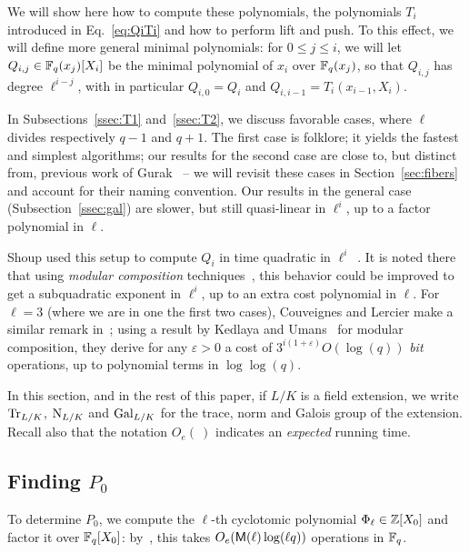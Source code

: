 \documentclass{sig-alternate}
\newcommand{\Cyc}{\Phi}  %
\begin{document}
We will show here how to compute these polynomials, the polynomials
$T_i$ introduced in Eq.~\eqref{eq:QiTi} and how to perform lift and
push.  To this effect, we will define more general minimal
polynomials: for $0 \le j \le i$, we will let $Q_{i,j} \in
\mathbb{F}_q(x_j)[X_i]$ be the minimal polynomial of $x_i$ over $\mathbb{F}_q(x_j)$,
so that $Q_{i,j}$ has degree $\ell^{i-j}$, with in particular
$Q_{i,0}=Q_i$ and $Q_{i,i-1}=T_i(x_{i-1},X_i)$.

In Subsections~\ref{ssec:T1} and~\ref{ssec:T2}, we discuss favorable
cases, where $\ell$ divides respectively $q-1$ and $q+1$. The first
case is folklore; it yields the fastest and simplest algorithms; our
results for the second case are close to, but distinct from, previous
work of Gurak~\cite{gurak06} -- we will revisit these cases in
Section~\ref{sec:fibers} and account for their naming convention. Our
results in the general case (Subsection~\ref{ssec:gal}) are slower,
but still quasi-linear in $\ell^i$, up to a factor polynomial in
$\ell$.

Shoup used this setup to compute $Q_i$ in time quad\-ratic in
$\ell^i$~\cite[Th.~11]{shoup94}. It is noted there that using {\em
  modular composition} techniques~\cite[Ch.~12]{vzGG}, this behavior
could be improved to get a subquadratic exponent in $\ell^i$, up to an
extra cost polynomial in $\ell$.  For $\ell=3$ (where we are in one
the first two cases), Couveignes and Lercier make a similar remark
in~\cite[\S~2.4]{couveignes+lercier11}; using a result by Kedlaya and
Umans~\cite{KeUm11} for modular composition, they derive for any
$\varepsilon > 0$ a cost of $3^{i(1+\varepsilon)}O(\log(q))$ {\em bit}
operations, up to polynomial terms in $\log\log(q)$.

In this section, and in the rest of this paper, if $L/K$ is a field
extension, we write $\operatorname{Tr}_{L/K}$, $\operatorname{N}_{L/K}$ and $\operatorname{Gal}_{L/K}$ for
the trace, norm and Galois group of the extension. Recall also that
the notation $O_e(\ )$ indicates an {\em expected} running time.


\subsection{Finding $P_0$}

To determine $P_0$, we compute the $\ell$-th cyclotomic polynomial
$\Cyc_\ell \in \Z[X_0]$ and factor it over $\mathbb{F}_q[X_0]$:
by~\cite[Th.~9]{shoup94}, this takes $O_e(\mathsf{M}(\ell)\log(\ell q))$
operations in $\mathbb{F}_q$.
\end{document}
